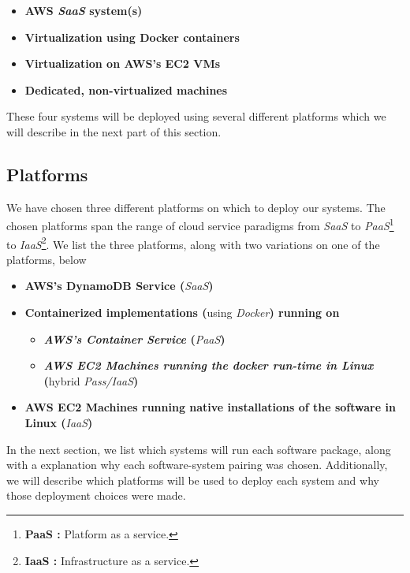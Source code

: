 \documentclass{article}[12pt]
\numberwithin{equation}{section}
\begin{document}
\begin{multicols*}{2}
\begin{spacing}{1.5}
\begin{itemize}
	\item \textbf{AWS \emph{SaaS} system(s)}
	\item \textbf{Virtualization using Docker containers}
	\item \textbf{Virtualization on AWS's EC2 VMs}
	\item \textbf{Dedicated, non-virtualized machines}
\end{itemize}

These four systems will be deployed using several different platforms which we will describe in the next part of this section.
\end{spacing}




\subsection{Platforms}
\begin{spacing}{1.5}
We have chosen three different platforms on which to deploy our systems.  The chosen platforms span the range of cloud service paradigms from \emph{SaaS} to \emph{PaaS}\footnote{\textbf{PaaS :} Platform as a service.} to \emph{IaaS}\footnote{\textbf{IaaS :} Infrastructure as a service.}.  We list the three platforms, along with two variations on one of the platforms, below

\begin{itemize}
	\item \textbf{AWS's DynamoDB Service (}\emph{SaaS}\textbf{)}
	\item \textbf{Containerized implementations (}using \emph{Docker}\textbf{) running on}
	\begin{itemize}
		\item \textbf{\emph{AWS's Container Service} (}\emph{PaaS}\textbf{)}
		\item \textbf{\emph{AWS EC2 Machines running the docker run-time in Linux} (}hybrid \emph{Pass/IaaS}\textbf{)}
	\end{itemize}
	\item \textbf{AWS EC2 Machines running native installations of the software in Linux (}\emph{IaaS}\textbf{)}
\end{itemize}

In the next section, we list which systems will run each software package, along with a explanation why each software-system pairing was chosen.  Additionally, we will describe which platforms will be used to deploy each system and why those deployment choices were made.
\end{spacing}






\end{multicols*}
\end{document}
